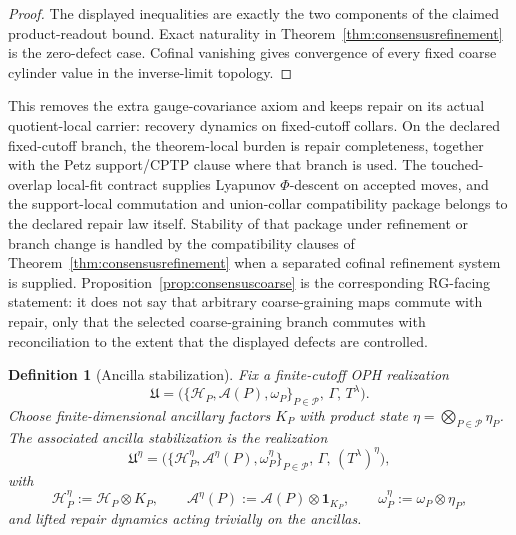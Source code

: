\documentclass[11pt]{article}
\newtheorem{definition}[theorem]{Definition}
\begin{document}
\begin{proof}
The displayed inequalities are exactly the two components of the claimed product-readout bound.
Exact naturality in Theorem~\ref{thm:consensusrefinement} is the zero-defect case. Cofinal
vanishing gives convergence of every fixed coarse cylinder value in the inverse-limit topology.
\end{proof}

This removes the extra gauge-covariance axiom and keeps repair on its actual quotient-local
carrier: recovery dynamics on fixed-cutoff collars. On the declared fixed-cutoff branch, the
theorem-local burden is repair completeness, together with the Petz support/CPTP clause
where that branch is used. The touched-overlap local-fit contract supplies Lyapunov
\(\Phi\)-descent on accepted moves, and the support-local commutation and union-collar
compatibility package belongs to the declared repair law itself. Stability of that package under
refinement or branch change is handled by the compatibility clauses of
Theorem~\ref{thm:consensusrefinement} when a separated cofinal refinement system is supplied.
Proposition~\ref{prop:consensuscoarse} is the corresponding RG-facing statement: it does not say
that arbitrary coarse-graining maps commute with repair, only that the selected coarse-graining
branch commutes with reconciliation to the extent that the displayed defects are controlled.

\begin{definition}[Ancilla stabilization]\label{def:ancillastab}
Fix a finite-cutoff OPH realization
\[
\mathfrak U=
\bigl(\{\mathcal H_P,\mathcal A(P),\omega_P\}_{P\in\mathcal P},\,\Gamma,\,T^\lambda\bigr).
\]
Choose finite-dimensional ancillary factors \(K_P\) with product state \(\eta=\bigotimes_{P\in\mathcal P}\eta_P\). The associated ancilla stabilization is the realization
\[
\mathfrak U^\eta=
\bigl(\{\mathcal H_P^\eta,\mathcal A^\eta(P),\omega_P^\eta\}_{P\in\mathcal P},\,\Gamma,\,(T^\lambda)^\eta\bigr),
\]
with
\[
\mathcal H_P^\eta:=\mathcal H_P\otimes K_P,\qquad
\mathcal A^\eta(P):=\mathcal A(P)\otimes \mathbf 1_{K_P},\qquad
\omega_P^\eta:=\omega_P\otimes \eta_P,
\]
and lifted repair dynamics acting trivially on the ancillas.
\end{definition}
\end{document}
